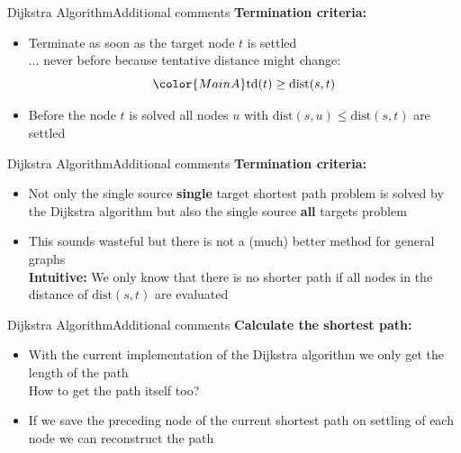 
\begin{frame}{Dijkstra Algorithm}{Additional comments}
  \textbf{Termination criteria:}
  \begin{itemize}
    \item
      Terminate as soon as the target node {\color{MainA}$t$} is settled\\
      $\ldots$ never before because tentative distance might change:
      \begin{displaymath}
        {\color{MainA}\mathrm{td}(t) \geq \mathrm{dist}(s, t)}
      \end{displaymath}
    \item
      Before the node {\color{MainA}$t$} is solved
      {\color{MainA}all nodes $u$} with
      {\color{MainA}$\mathrm{dist}(s, u) \leq \mathrm{dist}(s, t)$}
      are settled
  \end{itemize}
\end{frame}


\begin{frame}{Dijkstra Algorithm}{Additional comments}
  \textbf{Termination criteria:}
  \begin{itemize}
    \item
      Not only the {\color{MainA}single source \textbf{single} target}
      shortest path problem is solved by the Dijkstra algorithm but also the
      {\color{MainA}single source \textbf{all} targets} problem
    \item
      This sounds wasteful but there is not a (much) better method for general
      graphs\\
      \textbf{Intuitive:} We only know that there is no shorter path if
      all nodes in the distance of {\color{MainA}$\mathrm{dist}(s, t)$} are
      evaluated
  \end{itemize}
\end{frame}


\begin{frame}{Dijkstra Algorithm}{Additional comments}
  \textbf{Calculate the shortest path:}
  \begin{itemize}
    \item
      With the current implementation of the Dijkstra algorithm we only get
      the {\color{MainA}length} of the path\\
      {\color{gray}How to get the path itself too?}
    \item
      If we save the preceding node of the current shortest path on
      {\color{MainA}settling} of each node we can reconstruct the
      {\color{MainA}path}
  \end{itemize}
\end{frame}

